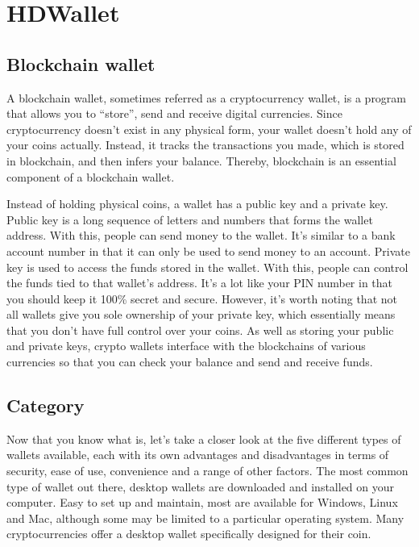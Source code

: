 \section{HDWallet}
\label{sec:hd_wallet}

\subsection{Blockchain wallet}
A blockchain wallet, sometimes referred as a cryptocurrency wallet, is a program that allows you to “store”, send and receive digital currencies. Since cryptocurrency doesn’t exist in any physical form, your wallet doesn’t hold any of your coins actually. Instead, it tracks the transactions you made, which is stored in blockchain, and then infers your balance. Thereby, blockchain is an essential component of a blockchain wallet.

Instead of holding physical coins, a wallet has a public key and a private key. Public key is a long sequence of letters and numbers that forms the wallet address. With this, people can send money to the wallet. It's similar to a bank account number in that it can only be used to send money to an account. Private key is used to access the funds stored in the wallet. With this, people can control the funds tied to that wallet's address. It's a lot like your PIN number in that you should keep it 100\% secret and secure. However, it's worth noting that not all wallets give you sole ownership of your private key, which essentially means that you don't have full control over your coins. As well as storing your public and private keys, crypto wallets interface with the blockchains of various currencies so that you can check your balance and send and receive funds.

\subsection{Category}

Now that you know what is, let’s take a closer look at the five different types of wallets available, each with its own advantages and disadvantages in terms of security, ease of use, convenience and a range of other factors. The most common type of wallet out there, desktop wallets are downloaded and installed on your computer. Easy to set up and maintain, most are available for Windows, Linux and Mac, although some may be limited to a particular operating system. Many cryptocurrencies offer a desktop wallet specifically designed for their coin.

